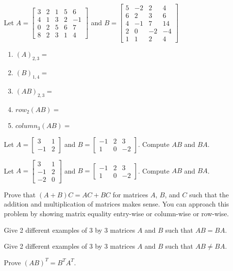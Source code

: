 \bq Let $A=\begin{bmatrix} 3&2&1&5&6\\4&1&3&2&-1\\0&2&5&6&7\\8&2&3&1&4 \end{bmatrix}$ and $B=\begin{bmatrix} 5&-2&2&4\\6&2&3&6\\4&-1&7&14\\2&0&-2&-4\\1&1&2&4 \end{bmatrix}$
\begin{enumerate}
\item $(A)_{2,3}=$
\item $(B)_{1,4}=$
\item $(AB)_{2,3}=$
\item $row_2 (AB)=$
\item $column_3 (AB)=$
\end{enumerate}
\eq

\bq Let $A=\begin{bmatrix} 3&1\\-1&2  \end{bmatrix}$ and $B=\begin{bmatrix} -1&2&3\\1&0&-2  \end{bmatrix}$. Compute $AB$ and $BA$.
\eq

\bq Let $A=\begin{bmatrix} 3&1\\-1&2 \\-2 & 0 \end{bmatrix}$ and $B=\begin{bmatrix} -1&2&3\\1&0&-2  \end{bmatrix}$. Compute $AB$ and $BA$.
\eq

\bq Prove that $(A+B)C=AC+BC$ for matrices $A$, $B$, and $C$ such that the addition and multiplication of matrices makes sense. You can approach this problem by showing matrix equality entry-wise or column-wise or row-wise.
\eq

\bq Give 2 different examples of 3 by 3 matrices $A$ and $B$ such that $AB=BA$.
\eq

\bq Give 2 different examples of 3 by 3 matrices $A$ and $B$ such that $AB \neq BA$.
\eq

\bq
Prove $(AB)^T=B^T A^T$.
\eq

